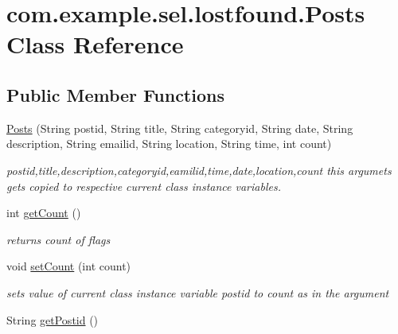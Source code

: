 \hypertarget{classcom_1_1example_1_1sel_1_1lostfound_1_1Posts}{}\section{com.\+example.\+sel.\+lostfound.\+Posts Class Reference}
\label{classcom_1_1example_1_1sel_1_1lostfound_1_1Posts}
\subsection*{Public Member Functions}
\begin{DoxyCompactItemize}
\item 
\hyperlink{classcom_1_1example_1_1sel_1_1lostfound_1_1Posts_af3a9099edc398eec8b8377e6438e94d1}{Posts} (String postid, String title, String categoryid, String date, String description, String emailid, String location, String time, int count)
\begin{DoxyCompactList}\small\item\em postid,title,description,categoryid,eamilid,time,date,location,count this argumets gets copied to respective current class instance variables. \end{DoxyCompactList}\item 
int \hyperlink{classcom_1_1example_1_1sel_1_1lostfound_1_1Posts_ab547a661789fd2b3b7ef0c8c2980de43}{get\+Count} ()\hypertarget{classcom_1_1example_1_1sel_1_1lostfound_1_1Posts_ab547a661789fd2b3b7ef0c8c2980de43}{}\label{classcom_1_1example_1_1sel_1_1lostfound_1_1Posts_ab547a661789fd2b3b7ef0c8c2980de43}

\begin{DoxyCompactList}\small\item\em returns count of flags \end{DoxyCompactList}\item 
void \hyperlink{classcom_1_1example_1_1sel_1_1lostfound_1_1Posts_a9e51f4b1317ea5716c213f2a44aa4374}{set\+Count} (int count)
\begin{DoxyCompactList}\small\item\em sets value of current class instance variable postid to count as in the argument \end{DoxyCompactList}\item 
String \hyperlink{classcom_1_1example_1_1sel_1_1lostfound_1_1Posts_ad3be37a34fadcbf1b1d27d58a689f88a}{get\+Postid} ()\hypertarget{classcom_1_1example_1_1sel_1_1lostfound_1_1Posts_ad3be37a34fadcbf1b1d27d58a689f88a}{}\label{classcom_1_1example_1_1sel_1_1lostfound_1_1Posts_ad3be37a34fadcbf1b1d27d58a689f88a}


\end{DoxyCompactItemize}
